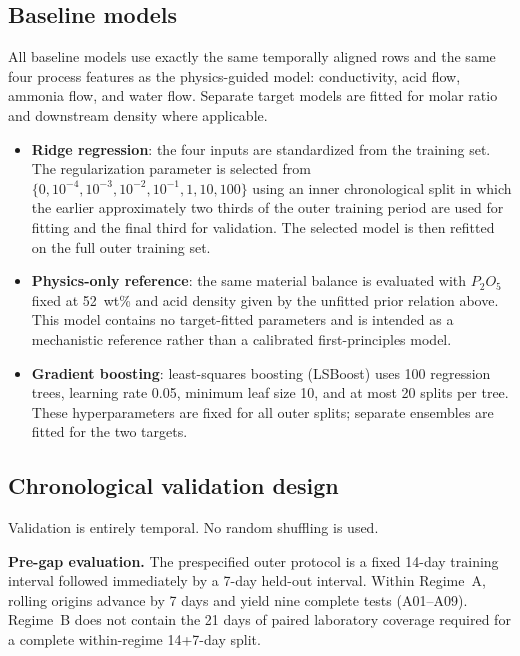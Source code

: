\documentclass[preprint,12pt,authoryear]{elsarticle}
\begin{document}
\subsection{Baseline models}

All baseline models use exactly the same temporally aligned rows and the same four process features as the physics-guided model: conductivity, acid flow, ammonia flow, and water flow. Separate target models are fitted for molar ratio and downstream density where applicable.

\begin{itemize}[leftmargin=1.5em]
\item \textbf{Ridge regression}: the four inputs are standardized from the training set. The regularization parameter is selected from $\{0,\allowbreak 10^{-4},\allowbreak 10^{-3},\allowbreak 10^{-2},\allowbreak 10^{-1},\allowbreak 1,\allowbreak 10,\allowbreak 100\}$ using an inner chronological split in which the earlier approximately two thirds of the outer training period are used for fitting and the final third for validation. The selected model is then refitted on the full outer training set.
\item \textbf{Physics-only reference}: the same material balance is evaluated with $P_2O_5$ fixed at 52~wt\% and acid density given by the unfitted prior relation above. This model contains no target-fitted parameters and is intended as a mechanistic reference rather than a calibrated first-principles model.
\item \textbf{Gradient boosting}: least-squares boosting (LSBoost) uses 100 regression trees, learning rate 0.05, minimum leaf size 10, and at most 20 splits per tree. These hyperparameters are fixed for all outer splits; separate ensembles are fitted for the two targets.
\end{itemize}

\subsection{Chronological validation design}

Validation is entirely temporal. No random shuffling is used.

\textbf{Pre-gap evaluation.} The prespecified outer protocol is a fixed 14-day training interval followed immediately by a 7-day held-out interval. Within Regime~A, rolling origins advance by 7 days and yield nine complete tests (A01--A09). Regime~B does not contain the 21 days of paired laboratory coverage required for a complete within-regime 14+7-day split.
\end{document}
